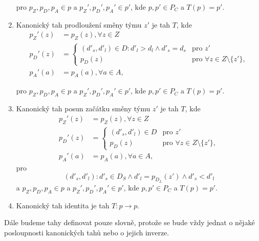 \begin{definice}
\begin{enumerate}
      pro $p_Z, p_D, p_A \in p$ a $p_Z', p_D', p_A' \in p'$, kde $p, p' \in P_C$ a $T(p) = p'$.

    \item
      Kanonický tah prodloužení směny týmu $z'$ je tah $T$, kde
      \begin{align*}
        p_Z'(z) &= p_Z(z), \forall z \in Z \\
        p_D'(z) &=
          \begin{cases}
            (d'_s, d'_l) \in D \colon d'_l > d_l \land d'_s = d_s  & \text{pro $z'$} \\
            p_D(z) & \text{pro $\forall z \in Z \setminus \{ z' \}$},
          \end{cases}
          \\
        p_A'(a) &= p_A(a), \forall a \in A,
      \end{align*}

      pro $p_Z, p_D, p_A \in p$ a $p_Z', p_D', p_A' \in p'$, kde $p, p' \in P_C$ a $T(p) = p'$.

    \item
      Kanonický tah posun začátku směny týmu $z'$ je tah $T$, kde
      \begin{align*}
        p_Z'(z) &= p_Z(z), \forall z \in Z \\
        p_D'(z) &=
          \begin{cases}
            (d'_s, d'_l) \in D   & \text{pro $z'$} \\
            p_D(z) & \text{pro $\forall z \in Z \setminus \{ z' \}$},
          \end{cases}
          \\
        p_A'(a) &= p_A(a), \forall a \in A,
      \end{align*}
      pro
      \begin{equation*}
        (d'_s, d'_l) \colon d'_s \in D_S \land d'_l = p_{D_L}(z') \land d'_s < d'_l
      \end{equation*}
      a $p_Z, p_D, p_A \in p$ a $p_Z', p_D', p_A' \in p'$, kde $p, p' \in P_C$ a $T(p) = p'$.

    \item
      Kanonický tah identita je tah $T: p \rightarrow p$.
  \end{enumerate}

\end{definice}

Dále budeme tahy definovat pouze slovně, protože se bude vždy jednat o nějaké posloupnosti kanonických tahů nebo o jejich inverze.


